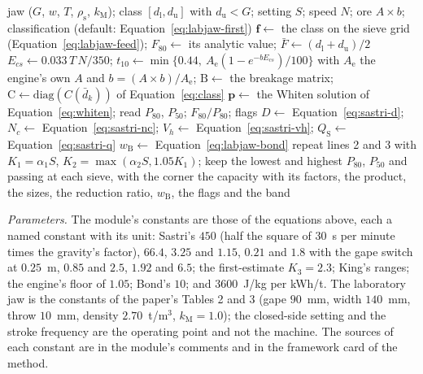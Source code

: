 \begin{algorithm}[!t]
\caption{Evaluation of a narrow feed class on the laboratory jaw (\texttt{pipeline/\allowbreak{}model/\allowbreak{}crusher/\allowbreak{}labjaw.py}, \texttt{evaluate\_lab\_jaw} and \texttt{king\_band}).}
\label{alg:labjaw}
\begin{algorithmic}[1]
\Require jaw ($G$, $w$, $T$, $\rho_{\mathrm s}$, $k_{\mathrm M}$); class $[d_{\mathrm l},d_{\mathrm u}]$ with $d_{\mathrm u}<G$; setting $S$; speed $N$; ore $A\times b$; classification (default: Equation~\eqref{eq:labjaw-first})
\State $\mathbf f\gets$ the class on the sieve grid (Equation~\eqref{eq:labjaw-feed}); $F_{80}\gets$ its analytic value; $\bar F\gets(d_{\mathrm l}+d_{\mathrm u})/2$
\State $E_{cs}\gets0.033\,T\,N/350$; $t_{10}\gets\min\{0.44,\ A_{\mathrm e}(1-e^{-bE_{cs}})/100\}$ with $A_{\mathrm e}$ the engine's own $A$ and $b=(A\times b)/A_{\mathrm e}$; $\mathrm B\gets$ the breakage matrix; $\mathrm C\gets\mathrm{diag}(C(\bar d_k))$ of Equation~\eqref{eq:class}
\State $\mathbf p\gets$ the Whiten solution of Equation~\eqref{eq:whiten}; read $P_{80}$, $P_{50}$; $F_{80}/P_{80}$; flags
\State $D\gets$ Equation~\eqref{eq:sastri-d}; $N_c\gets$ Equation~\eqref{eq:sastri-nc}; $V_h\gets$ Equation~\eqref{eq:sastri-vh}; $Q_{\mathrm S}\gets$ Equation~\eqref{eq:sastri-q}
\State $w_{\mathrm B}\gets$ Equation~\eqref{eq:labjaw-bond}
  \State repeat lines 2 and 3 with $K_1=\alpha_1S$, $K_2=\max(\alpha_2S,1.05K_1)$; keep the lowest and highest $P_{80}$, $P_{50}$ and passing at each sieve, with the corner
\EndFor
\State \Return the capacity with its factors, the product, the sizes, the reduction ratio, $w_{\mathrm B}$, the flags and the band
\end{algorithmic}
\end{algorithm}

\emph{Parameters.} The module's constants are those of the equations above, each a named constant with its unit: Sastri's $450$ (half the square of $30$~s per minute times the gravity's factor), $66.4$, $3.25$ and $1.15$, $0.21$ and $1.8$ with the gape switch at $0.25$~m, $0.85$ and $2.5$, $1.92$ and $6.5$; the first-estimate $K_3=2.3$; King's ranges; the engine's floor of $1.05$; Bond's $10$; and $3600$~J/kg per kWh/t. The laboratory jaw is the constants of the paper's Tables 2 and 3 (gape $90$~mm, width $140$~mm, throw $10$~mm, density $2.70$~t/m$^3$, $k_{\mathrm M}=1.0$); the closed-side setting and the stroke frequency are the operating point and not the machine.
The sources of each constant are in the module's comments and in the framework card of the method.

